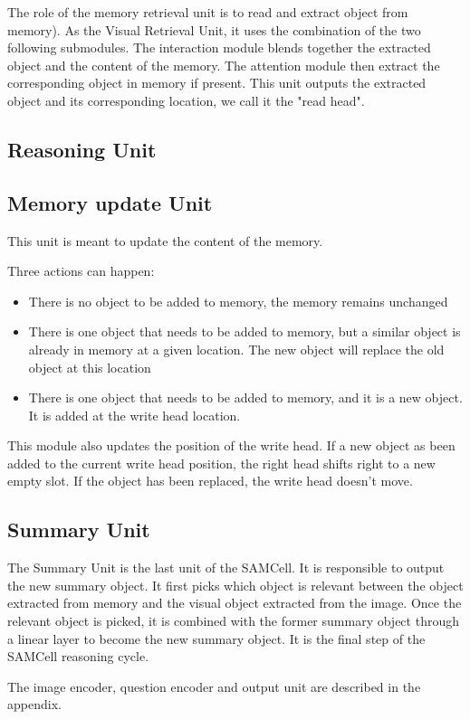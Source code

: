The role of the memory retrieval unit is to read and extract object from memory).
As the Visual Retrieval Unit, it uses the combination of the two following submodules. The interaction module blends together the extracted object and the content of the memory. The attention module then extract the corresponding object in memory if present. This unit outputs the extracted object and its corresponding location, we call it the "read head".


\subsection{Reasoning Unit}


\subsection{Memory update Unit}

This unit is meant to update the content of the memory. 

Three actions can happen:

\begin{itemize}
	\item There is no object to be added to memory, the memory remains unchanged
	\item There is one object that needs to be added to memory, but a similar object is already in memory at a given location. The new object will replace the old object at this location
	
	\item There is one object that needs to be added to memory, and  it is a new object. It is added at the write head location.
\end{itemize}


This module also updates the position of the write head. If a new object as been added to the current write head position, the right head shifts right to a new empty slot. If the object has been replaced, the write head doesn't move.

\subsection{Summary  Unit}

The  Summary Unit is the last unit of the SAMCell. It is responsible to output the new summary object. It first picks which object is relevant between the object extracted from memory and the visual object extracted from the image. Once the relevant object is picked, it is combined with the former summary object through a linear layer to become the new summary object. It is the final step of the SAMCell reasoning cycle. 

The image encoder, question encoder and output unit are described in the appendix.
